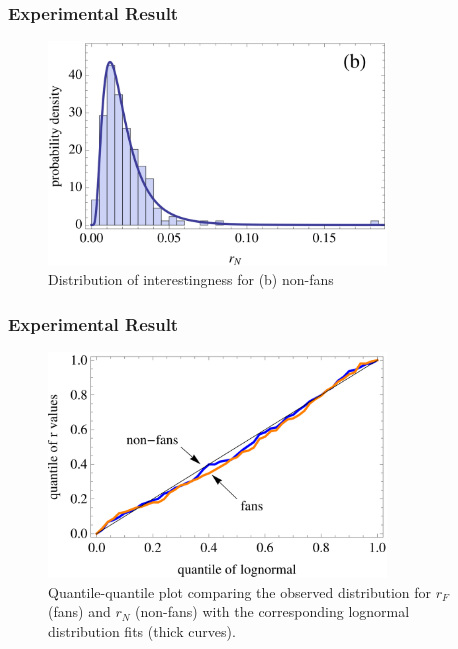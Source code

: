 \documentclass[aspectratio=43]{beamer}
\begin{document}
\begin{frame}
\frametitle{Experimental Result}
\centering
\begin{minipage}{\textwidth}
\begin{figure}
\centering
\includegraphics[width=0.8\textwidth]{fig09.PNG}
\caption{Distribution of interestingness for (b) non-fans}
\end{figure}
\end{minipage}
\end{frame}

\begin{frame}
\frametitle{Experimental Result}
\centering
\begin{minipage}{\textwidth}
\begin{figure}
\centering
\includegraphics[width=0.8\textwidth]{fig10.PNG}
\caption{ Quantile-quantile plot comparing the observed distribution for $r_F$ (fans) and $r_N$ (non-fans) with the corresponding lognormal distribution fits (thick curves).}
\end{figure}
\end{minipage}
\end{frame}
\end{document}
